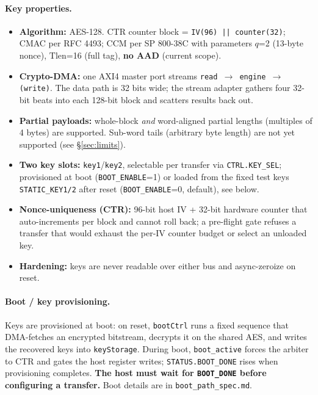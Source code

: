 \documentclass[11pt,a4paper]{article}
\newcommand{\reg}[1]{\texttt{#1}}
\newcommand{\bit}[1]{\texttt{#1}}
\begin{document}
\paragraph{Key properties.}
\begin{itemize}[nosep]
  \item \textbf{Algorithm:} AES-128. CTR counter block = \texttt{IV(96) || counter(32)};
        CMAC per RFC 4493; CCM per SP 800-38C with parameters \(q\)=2 (13-byte nonce),
        \(\text{Tlen}\)=16 (full tag), \textbf{no AAD} (current scope).
  \item \textbf{Crypto-DMA:} one AXI4 master port streams
        \texttt{read $\rightarrow$ engine $\rightarrow$ (write)}. The data path is 32 bits
        wide; the stream adapter gathers four 32-bit beats into each 128-bit block and
        scatters results back out.
  \item \textbf{Partial payloads:} whole-block \emph{and} word-aligned partial lengths
        (multiples of 4 bytes) are supported. Sub-word tails (arbitrary byte length) are not
        yet supported (see \S\ref{sec:limits}).
  \item \textbf{Two key slots:} \reg{key1}/\reg{key2}, selectable per transfer via
        \bit{CTRL.KEY\_SEL}; provisioned at boot (\texttt{BOOT\_ENABLE}=1) or loaded from the
        fixed test keys \texttt{STATIC\_KEY1/2} after reset (\texttt{BOOT\_ENABLE}=0, default),
        see below.
  \item \textbf{Nonce-uniqueness (CTR):} 96-bit host IV + 32-bit hardware counter that
        auto-increments per block and cannot roll back; a pre-flight gate refuses a transfer
        that would exhaust the per-IV counter budget or select an unloaded key.
  \item \textbf{Hardening:} keys are never readable over either bus and async-zeroize on reset.
\end{itemize}

\paragraph{Boot / key provisioning.}
Keys are provisioned at boot: on reset, \reg{bootCtrl} runs a fixed sequence that
DMA-fetches an encrypted bitstream, decrypts it on the shared AES, and writes the recovered
keys into \reg{keyStorage}. During boot, \bit{boot\_active} forces the arbiter to CTR and
gates the host register writes; \bit{STATUS.BOOT\_DONE} rises when provisioning completes.
\textbf{The host must wait for \bit{BOOT\_DONE} before configuring a transfer.} Boot details
are in \texttt{boot\_path\_spec.md}.
\end{document}
